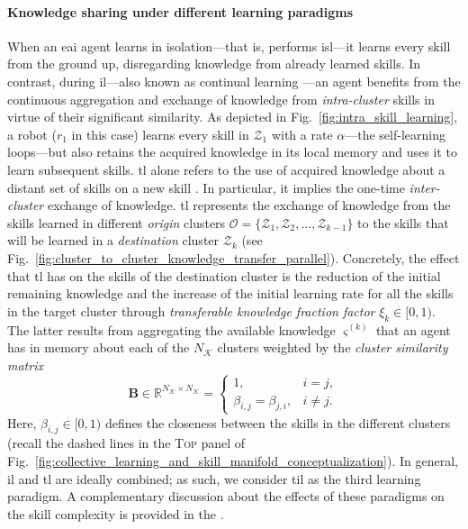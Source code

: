 \documentclass[12pt]{article}
\renewcommand{\emph}[1]{\textit{#1}}
\begin{document}
\paragraph*{Knowledge sharing under different learning paradigms}
When an \ac{eai} agent learns in isolation---that is, performs \ac{isl}---it learns every skill from the ground up, disregarding knowledge from already learned skills. In contrast, during \ac{il}---also known as continual learning \cite{Lesort2020Continuallearningrobotics}---an agent benefits from the continuous aggregation and exchange of knowledge from \emph{intra-cluster} skills in virtue of their significant similarity. As depicted in Fig.~\ref{fig:intra_skill_learning}, a robot ($r_1$ in this case) learns every skill in $\mathcal{Z}_1$ with a rate $\alpha$---the self-learning loops---but also retains the acquired knowledge in its local memory and uses it to learn subsequent skills. \Ac{tl} alone refers to the use of acquired knowledge about a distant set of skills on a new skill \cite{Hosna2022Transferlearningfriendly,Jaquier2023TransferLearningRobotics}. In particular, it implies the one-time \emph{inter-cluster} exchange of knowledge. \Ac{tl} represents the exchange of knowledge from the skills learned in different \emph{origin} clusters $\mathcal{O} = \{ \mathcal{Z}_1,\mathcal{Z}_2,\ldots,\mathcal{Z}_{k-1} \}$ to the skills that will be learned in a \emph{destination} cluster $\mathcal{Z}_k$ (see Fig.~\ref{fig:cluster_to_cluster_knowledge_transfer_parallel}). Concretely, the effect that \ac{tl} has on the skills of the destination cluster is the reduction of the initial remaining knowledge and the increase of the initial learning rate for all the skills in the target cluster through \emph{transferable knowledge fraction factor} $\xi_k \in [0,1)$. The latter results from aggregating the available knowledge $\varsigma^{(k)}$ that an agent has in memory about each of the $N_\mathcal{K}$ clusters weighted by the \emph{cluster similarity matrix}
\begin{equation}\label{eq:cluster_similarity_matrix}
	\bm{B}\in \mathbb{R}^{N_\mathcal{K} \times N_\mathcal{K}}=\begin{cases}
		1, & i=j, \\
		\beta_{i,j} = \beta_{j,i}, & i \neq j.
	\end{cases}
\end{equation}
Here, $\beta_{i,j} \in [0,1)$ defines the closeness between the skills in the different clusters (recall the dashed lines in the \textsc{Top} panel of Fig.~\ref{fig:collective_learning_and_skill_manifold_conceptualization}). In general, \ac{il} and \ac{tl} are ideally combined; as such, we consider \ac{til} as the third learning paradigm. A complementary discussion about the effects of these paradigms on the skill complexity is provided in the .
\end{document}
